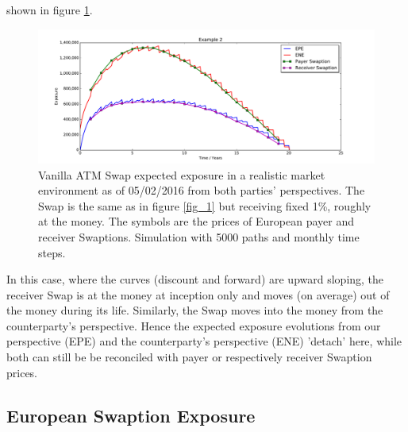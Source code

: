 \documentclass[12pt, a4paper]{article}
\begin{document}
{shown in figure \ref{fig_2}.
\begin{figure}[h!]
\begin{center}
\includegraphics[scale=0.45]{mpl_swap_3.pdf}
\end{center}
\caption{Vanilla ATM Swap expected exposure in a realistic market environment as of 05/02/2016 from both parties'
  perspectives. The Swap is the same as in figure \ref{fig_1} but receiving fixed 1\%, roughly at the money. The symbols
  are the prices of European payer and receiver Swaptions. Simulation with 5000 paths and monthly time steps.}
\label{fig_2}
\end{figure}
In this case, where the curves (discount and forward) are upward sloping, the receiver Swap is at the money at inception
only and moves (on average) out of the money during its life. Similarly, the Swap moves into the money from the
counterparty's perspective. Hence the expected exposure evolutions from our perspective (EPE) and the counterparty's
perspective (ENE) 'detach' here, while both can still be be reconciled with payer or respectively receiver Swaption
prices.

\subsection{European Swaption Exposure}\label{sec:european_swaption}

}
\end{document}
